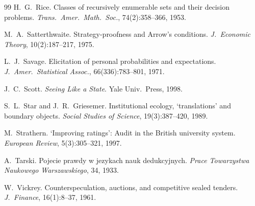 \documentclass[12pt,a4paper]{article}
\begin{document}
\begin{thebibliography}{99}
H.~G.~Rice.
\newblock Classes of recursively enumerable sets and their decision problems.
\newblock \emph{Trans.\ Amer.\ Math.\ Soc.}, 74(2):358--366, 1953.

M.~A.~Satterthwaite.
\newblock Strategy-proofness and Arrow's conditions.
\newblock \emph{J.\ Economic Theory}, 10(2):187--217, 1975.

L.~J.~Savage.
\newblock Elicitation of personal probabilities and expectations.
\newblock \emph{J.\ Amer.\ Statistical Assoc.}, 66(336):783--801, 1971.

J.~C.~Scott.
\newblock \emph{Seeing Like a State}.
\newblock Yale Univ.\ Press, 1998.

S.~L.~Star and J.~R.~Griesemer.
\newblock Institutional ecology, `translations' and boundary objects.
\newblock \emph{Social Studies of Science}, 19(3):387--420, 1989.

M.~Strathern.
\newblock `Improving ratings': Audit in the British university system.
\newblock \emph{European Review}, 5(3):305--321, 1997.

A.~Tarski.
\newblock Pojecie prawdy w jezykach nauk dedukcyjnych.
\newblock \emph{Prace Towarzystwa Naukowego Warszawskiego}, 34, 1933.

W.~Vickrey.
\newblock Counterspeculation, auctions, and competitive sealed tenders.
\newblock \emph{J.\ Finance}, 16(1):8--37, 1961.

\end{thebibliography}
\end{document}
